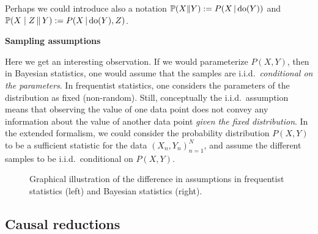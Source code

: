 Perhaps we could introduce also a notation $\mathbb{P}(X \Vert Y) := P(X \operatorname*{|} \operatorname{do}(Y))$ and $\mathbb{P}(X \mid Z \,\Vert\, Y) := P(X \operatorname*{|} \operatorname{do}(Y), Z)$.

\textbf{Sampling assumptions}

Here we get an interesting observation.
If we would parameterize $P(X,Y)$, then in Bayesian statistics, one would assume that the
samples are i.i.d.\ \emph{conditional on the parameters}. In frequentist statistics, one considers
the parameters of the distribution as fixed (non-random). Still, conceptually the i.i.d.\ assumption
means that observing the value of one data point does not convey any information about the value
of another data point \emph{given the fixed distribution}. In the extended formalism, we could 
consider the probability distribution $P(X,Y)$ to be a sufficient statistic for the data
$(X_n,Y_n)_{n=1}^N$, and assume the different samples to be i.i.d.\ conditional on $P(X,Y)$.

\begin{figure}\centering
{}
\caption{Graphical illustration of the difference in assumptions in frequentist statistics (left) and Bayesian statistics (right).}
\end{figure}

\subsection{Causal reductions}


